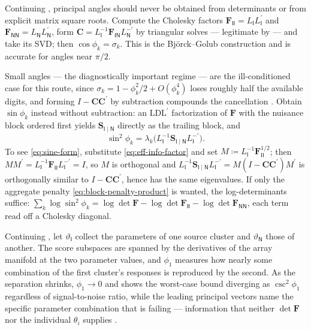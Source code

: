 \documentclass{IEEEtran}
\begin{document}
\begin{remark}
  \label{rem:angle-computation}
  Continuing , principal angles should never be obtained from determinants or from explicit matrix square roots. Compute the Cholesky factors $\mathbf{F}_{\mathsf{II}}=L_{\mathsf{I}}L_{\mathsf{I}}^{\prime}$ and $\mathbf{F}_{\mathsf{NN}}=L_{\mathsf{N}}L_{\mathsf{N}}^{\prime}$, form $\mathbf{C} = L_{\mathsf{I}}^{-1}\mathbf{F}_{\mathsf{IN}}L_{\mathsf{N}}^{-\prime}$ by triangular solves --- legitimate by  --- and take its SVD; then $\cos\phi_{k}=\sigma_{k}$. This is the Bj\"orck--Golub construction \cite{bjorck1973} and is accurate for angles near $\pi/2$.

  Small angles --- the diagnostically important regime --- are the ill-conditioned case for this route, since $\sigma_{k} = 1 - \phi_{k}^{2}/2 + O(\phi_{k}^{4})$ loses roughly half the available digits, and forming $I - \mathbf{C}\mathbf{C}^{\prime}$ by subtraction compounds the cancellation \cite{knyazev2002}. Obtain $\sin\phi_{k}$ instead without subtraction: an $\mathrm{LDL}^{\prime}$ factorization of $\mathbf{F}$ with the nuisance block ordered first yields $\mathbf{S}_{\mathsf{I}\mid\mathsf{N}}$ directly as the trailing block, and
  \begin{equation}
    \sin^{2}\phi_{k}
    = \lambda_{k}\bigl(L_{\mathsf{I}}^{-1}\mathbf{S}_{\mathsf{I}\mid\mathsf{N}}L_{\mathsf{I}}^{-\prime}\bigr) .
    \label{eq:sine-form}
  \end{equation}
  To see \eqref{eq:sine-form}, substitute \eqref{eq:eff-info-factor} and set $M \coloneq L_{\mathsf{I}}^{-1}\mathbf{F}_{\mathsf{II}}^{1/2}$; then $MM^{\prime} = L_{\mathsf{I}}^{-1}\mathbf{F}_{\mathsf{II}}L_{\mathsf{I}}^{-\prime} = I$, so $M$ is orthogonal and
  $L_{\mathsf{I}}^{-1}\mathbf{S}_{\mathsf{I}\mid\mathsf{N}}L_{\mathsf{I}}^{-\prime} = M(I - \mathbf{C}\mathbf{C}^{\prime})M^{\prime}$
  is orthogonally similar to $I - \mathbf{C}\mathbf{C}^{\prime}$, hence has the same eigenvalues. If only the aggregate penalty \eqref{eq:block-penalty-product} is wanted, the log-determinants suffice: $\sum_{k}\log\sin^{2}\phi_{k} = \log\det\mathbf{F} - \log\det\mathbf{F}_{\mathsf{II}} - \log\det\mathbf{F}_{\mathsf{NN}}$, each term read off a Cholesky diagonal.
\end{remark}

\begin{example}
  \label{ex:principal-angles-superresolution}
  Continuing , let $\vartheta_{\mathsf{I}}$ collect the parameters of one source cluster and $\vartheta_{\mathsf{N}}$ those of another. The score subspaces are spanned by the derivatives of the array manifold at the two parameter values, and $\phi_{1}$ measures how nearly some combination of the first cluster's responses is reproduced by the second. As the separation shrinks, $\phi_{1}\to 0$ and  shows the worst-case bound diverging as $\csc^{2}\phi_{1}$ regardless of signal-to-noise ratio, while the leading principal vectors name the specific parameter combination that is failing --- information that neither $\det\mathbf{F}$ nor the individual $\theta_{i}$ supplies \cite{stoica1989}.
\end{example}
\end{document}

